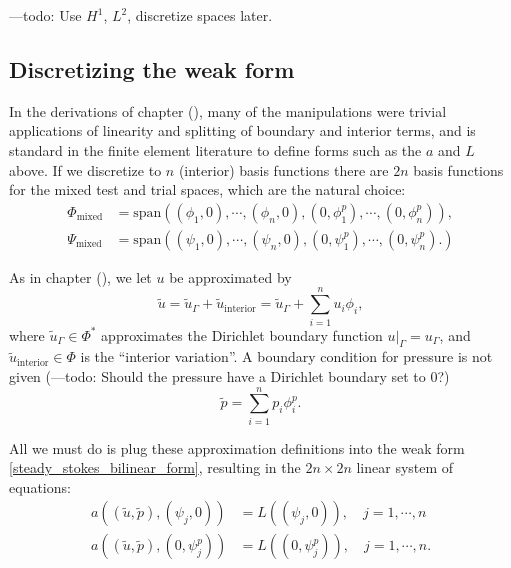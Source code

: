 ---todo: Use $H^1$, $L^2$, discretize spaces later.
\subsection{Discretizing the weak form}

In the derivations of chapter (), many of the manipulations were trivial applications of linearity and splitting of
boundary and interior terms, and is standard in the finite element literature to define forms such as the $a$ and $L$ above.
If we discretize to $n$ (interior) basis functions
there are $2n$ basis functions for the mixed test and trial spaces, which are the natural choice:
\begin{equation}
\begin{split}
    \Phi_{\text{mixed}} &= \text{span}\left(
        (\phi_1, 0),\cdots,(\phi_n, 0), (0,\phi_1^p),\cdots,(0,\phi_n^p)
    \right),\\
    \Psi_{\text{mixed}} &= \text{span}\left(
        (\psi_1, 0),\cdots,(\psi_n, 0), (0,\psi_1^p),\cdots,(0,\psi_n^p).
    \right)
\end{split}
\end{equation}

As in chapter (), we let $u$ be approximated by
    $$\tilde{u} = \tilde{u}_\Gamma + \tilde{u}_\text{interior} = \tilde{u}_\Gamma + \sum_{i=1}^n u_i\phi_i,$$
where $\tilde{u}_\Gamma \in \Phi^*$ approximates the Dirichlet boundary function $\left.u\right|_\Gamma = u_\Gamma$,
and $\tilde{u}_{\text{interior}} \in \Phi$ is the ``interior variation''. A boundary condition for pressure is not given
(---todo: Should the pressure have a Dirichlet boundary set to $0$?)
    $$\tilde{p} = \sum_{i=1}^n p_i\phi^p_i.$$


All we must do is plug these approximation definitions into the weak form \eqref{steady_stokes_bilinear_form}, resulting in the
$2n \times 2n$ linear system of equations:
\begin{equation}
\begin{split}
    a((\tilde{u}, \tilde{p}), (\psi_j, 0)) &= L((\psi_j, 0)), \quad j = 1,\cdots,n\\
    a((\tilde{u}, \tilde{p}), (0, \psi^p_j)) &= L((0, \psi^p_j)), \quad j = 1,\cdots,n.
\end{split}
\end{equation}


